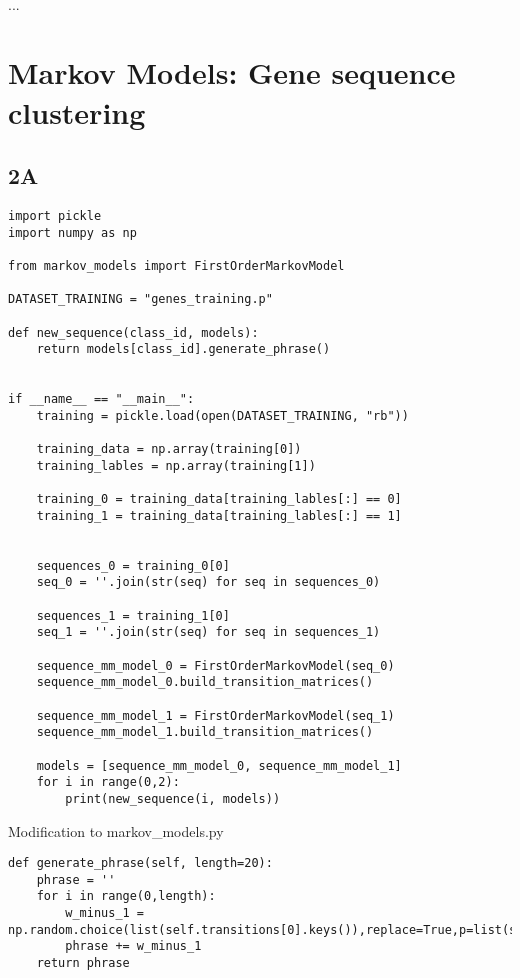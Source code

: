 \documentclass[12pt]{article}
\begin{document}
\begin{flushleft}
\\
		\vspace{0.5cm}
		...\\
\vspace{0.5cm}
		
		
		
		
		\section{Markov Models: Gene sequence clustering}
		\subsection*{2A}
		\begin{lstlisting}
import pickle
import numpy as np 

from markov_models import FirstOrderMarkovModel

DATASET_TRAINING = "genes_training.p"

def new_sequence(class_id, models):
	return models[class_id].generate_phrase()


if __name__ == "__main__":
	training = pickle.load(open(DATASET_TRAINING, "rb"))
	
	training_data = np.array(training[0])
	training_lables = np.array(training[1])
	
	training_0 = training_data[training_lables[:] == 0]
	training_1 = training_data[training_lables[:] == 1]
	
	
	sequences_0 = training_0[0]
	seq_0 = ''.join(str(seq) for seq in sequences_0)
	
	sequences_1 = training_1[0]
	seq_1 = ''.join(str(seq) for seq in sequences_1)
	
	sequence_mm_model_0 = FirstOrderMarkovModel(seq_0)
	sequence_mm_model_0.build_transition_matrices()
	
	sequence_mm_model_1 = FirstOrderMarkovModel(seq_1)
	sequence_mm_model_1.build_transition_matrices()
	
	models = [sequence_mm_model_0, sequence_mm_model_1]
	for i in range(0,2):
		print(new_sequence(i, models))
		\end{lstlisting}
		
		Modification to markov\_models.py\\
		\begin{lstlisting}
def generate_phrase(self, length=20):
	phrase = ''
	for i in range(0,length):
		w_minus_1 = np.random.choice(list(self.transitions[0].keys()),replace=True,p=list(self.transitions[0].values()))
		phrase += w_minus_1
	return phrase
		\end{lstlisting}
		

\end{flushleft}
\end{document}

